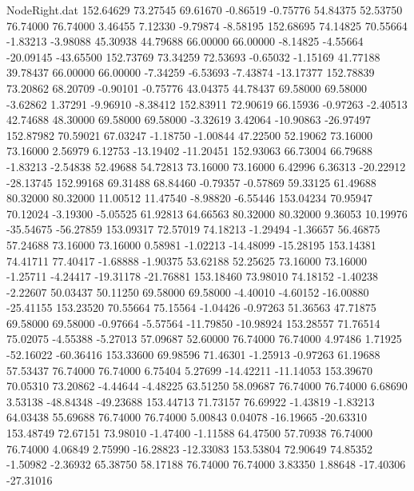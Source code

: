 \begin{filecontents}{NodeRight.dat}
 152.64629   73.27545   69.61670    -0.86519   -0.75776   54.84375   52.53750   76.74000   76.74000    3.46455    7.12330   -9.79874   -8.58195
 152.68695   74.14825   70.55664    -1.83213   -3.98088   45.30938   44.79688   66.00000   66.00000   -8.14825   -4.55664  -20.09145  -43.65500
 152.73769   73.34259   72.53693    -0.65032   -1.15169   41.77188   39.78437   66.00000   66.00000   -7.34259   -6.53693   -7.43874  -13.17377
 152.78839   73.20862   68.20709    -0.90101   -0.75776   43.04375   44.78437   69.58000   69.58000   -3.62862    1.37291   -9.96910   -8.38412
 152.83911   72.90619   66.15936    -0.97263   -2.40513   42.74688   48.30000   69.58000   69.58000   -3.32619    3.42064  -10.90863  -26.97497
 152.87982   70.59021   67.03247    -1.18750   -1.00844   47.22500   52.19062   73.16000   73.16000    2.56979    6.12753  -13.19402  -11.20451
 152.93063   66.73004   66.79688    -1.83213   -2.54838   52.49688   54.72813   73.16000   73.16000    6.42996    6.36313  -20.22912  -28.13745
 152.99168   69.31488   68.84460    -0.79357   -0.57869   59.33125   61.49688   80.32000   80.32000   11.00512   11.47540   -8.98820   -6.55446
 153.04234   70.95947   70.12024    -3.19300   -5.05525   61.92813   64.66563   80.32000   80.32000    9.36053   10.19976  -35.54675  -56.27859
 153.09317   72.57019   74.18213    -1.29494   -1.36657   56.46875   57.24688   73.16000   73.16000    0.58981   -1.02213  -14.48099  -15.28195
 153.14381   74.41711   77.40417    -1.68888   -1.90375   53.62188   52.25625   73.16000   73.16000   -1.25711   -4.24417  -19.31178  -21.76881
 153.18460   73.98010   74.18152    -1.40238   -2.22607   50.03437   50.11250   69.58000   69.58000   -4.40010   -4.60152  -16.00880  -25.41155
 153.23520   70.55664   75.15564    -1.04426   -0.97263   51.36563   47.71875   69.58000   69.58000   -0.97664   -5.57564  -11.79850  -10.98924
 153.28557   71.76514   75.02075    -4.55388   -5.27013   57.09687   52.60000   76.74000   76.74000    4.97486    1.71925  -52.16022  -60.36416
 153.33600   69.98596   71.46301    -1.25913   -0.97263   61.19688   57.53437   76.74000   76.74000    6.75404    5.27699  -14.42211  -11.14053
 153.39670   70.05310   73.20862    -4.44644   -4.48225   63.51250   58.09687   76.74000   76.74000    6.68690    3.53138  -48.84348  -49.23688
 153.44713   71.73157   76.69922    -1.43819   -1.83213   64.03438   55.69688   76.74000   76.74000    5.00843    0.04078  -16.19665  -20.63310
 153.48749   72.67151   73.98010    -1.47400   -1.11588   64.47500   57.70938   76.74000   76.74000    4.06849    2.75990  -16.28823  -12.33083
 153.53804   72.90649   74.85352    -1.50982   -2.36932   65.38750   58.17188   76.74000   76.74000    3.83350    1.88648  -17.40306  -27.31016

\end{filecontents}
